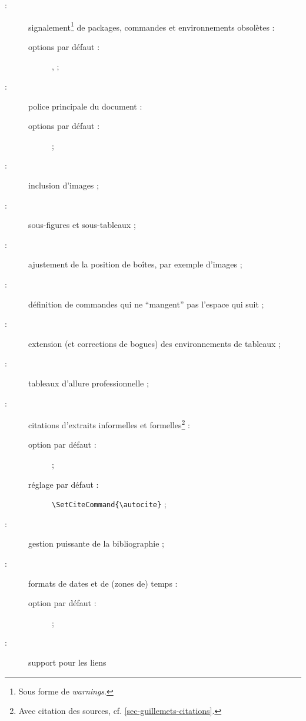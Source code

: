 \documentclass[english,nolocaltoc]{nwejmart}
\newtheorem[style=definition]{fait}
\newtheorem[title=expérience]{experience}
\newtheorem[title-plural=anneaux]{anneau}
\newtheorem[title=idéal,title-plural=idéaux]{ideal}
\begin{document}
\begin{description}
\item[ :] signalement\footnote{Sous forme de \emph{warnings}.} de
  packages, commandes et environnements obsolètes :
  \begin{description}
  \item[options par défaut :] ,  ;
  \end{description}
\item[ :] police principale du document :
  \begin{description}
  \item[options par défaut :]  ;
  \end{description}
\item[ :] inclusion d'images ;
\item[ :] sous-figures et sous-tableaux ;
\item[ :] ajustement de la position de boîtes, par exemple
  d'images ;
\item[ :] définition de commandes qui ne \enquote{mangent} pas
  l'espace qui suit ;
\item[ :] extension (et corrections de bogues) des
  environnements de tableaux ;
\item[ :] tableaux d'allure professionnelle ;
\item[ :] citations d'extraits informelles et
  formelles\footnote{Avec citation des sources,
    cf. \vref{sec-guillemets-citations}.} :
    \begin{description}
    \item[option par défaut :]  ;
    \item[réglage par défaut :]
      \lstinline[alsolanguage={[csquotes]TeX},alsolanguage={[biblatex]TeX}]|\SetCiteCommand{\autocite}| ;
  \end{description}
\item[ :] gestion puissante de la bibliographie ;
\item[ :] formats de dates et de (zones de) temps :
  \begin{description}
  \item[option par défaut :]  ;
  \end{description}
\item[ :] support pour les liens

\end{description}
\end{document}
